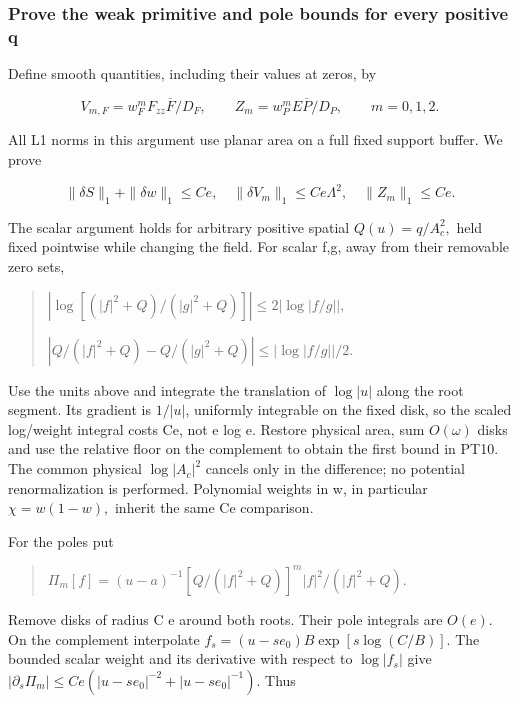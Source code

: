 \subsubsection{Prove the weak primitive and pole bounds for every positive q}
\label{subsec:pt-3}

Define smooth quantities, including their values at zeros, by

\[
V_{m,F}=w_F^m F_{zz}\overline F/D_F,
\qquad Z_m=w_P^m E\overline P/D_P,\qquad m=0,1,2.
\tag{PT9}\label{eq:ansatz-pt9}
\]

All L1 norms in this argument use planar area on a full fixed support buffer. We prove

\[
\boxed{\|\delta S\|_1+\|\delta w\|_1\le Ce,\quad
\|\delta V_m\|_1\le Ce\Lambda^2,\quad \|Z_m\|_1\le Ce.}
\tag{PT10}\label{eq:ansatz-pt10}
\]

The scalar argument holds for arbitrary positive spatial \(Q(u)=q/A_{c}^{2},\) held fixed pointwise while changing the field. For scalar f,g, away from their removable zero sets,

\begin{quote}\small
\(|\log[(|f|^{2}+Q)/(|g|^{2}+Q)]|\le 2|\log|f/g||,\)\par
\(|Q/(|f|^{2}+Q)-Q/(|g|^{2}+Q)|\le |\log|f/g||/2.\)\par
\end{quote}
Use the units above and integrate the translation of \(\log|u|\) along the root segment. Its gradient is $1/|u|$, uniformly integrable on the fixed disk, so the scaled log/weight integral costs Ce, not e log e. Restore physical area, sum \(O(\omega)\) disks and use the relative floor on the complement to obtain the first bound in PT10. The common physical \(\log|A_{c}|^{2}\) cancels only in the difference; no potential renormalization is performed. Polynomial weights in w, in particular \(\chi=w(1-w),\) inherit the same Ce comparison.

For the poles put

\begin{quote}\small
\(\Pi_{m}[f]=(u-a)^{-1}[Q/(|f|^{2}+Q)]^{m} |f|^{2}/(|f|^{2}+Q).\)\par
\end{quote}
Remove disks of radius C e around both roots. Their pole integrals are \(O(e).\) On the complement interpolate \(f_{s}=(u-s e_0)B \exp[s \log(C/B)].\) The bounded scalar weight and its derivative with respect to \(\log|f_{s}|\) give \(|\partial_{s} \Pi_{m}|\le Ce(|u-s e_0|^{-2}+|u-s e_0|^{-1}).\) Thus

